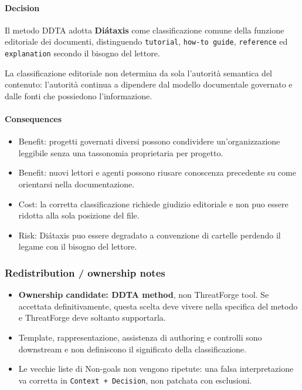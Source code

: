 \documentclass[
  10pt,
]{article}
\providecommand{\tightlist}{%
  \setlength{\itemsep}{0pt}\setlength{\parskip}{0pt}}
\begin{document}
\paragraph{Decision}\label{decision-1}

Il metodo DDTA adotta \textbf{Diátaxis} come classificazione comune
della funzione editoriale dei documenti, distinguendo \texttt{tutorial},
\texttt{how-to\ guide}, \texttt{reference} ed \texttt{explanation}
secondo il bisogno del lettore.

La classificazione editoriale non determina da sola l'autorità semantica
del contenuto: l'autorità continua a dipendere dal modello documentale
governato e dalle fonti che possiedono l'informazione.

\paragraph{Consequences}\label{consequences-1}

\begin{itemize}
\tightlist
\item
  Benefit: progetti governati diversi possono condividere
  un'organizzazione leggibile senza una tassonomia proprietaria per
  progetto.
\item
  Benefit: nuovi lettori e agenti possono riusare conoscenza precedente
  su come orientarsi nella documentazione.
\item
  Cost: la corretta classificazione richiede giudizio editoriale e non
  puo essere ridotta alla sola posizione del file.
\item
  Risk: Diátaxis puo essere degradato a convenzione di cartelle perdendo
  il legame con il bisogno del lettore.
\end{itemize}

\subsubsection{Redistribution / ownership
notes}\label{redistribution-ownership-notes}

\begin{itemize}
\tightlist
\item
  \textbf{Ownership candidate: DDTA method}, non ThreatForge tool. Se
  accettata definitivamente, questa scelta deve vivere nella specifica
  del metodo e ThreatForge deve soltanto supportarla.
\item
  Template, rappresentazione, assistenza di authoring e controlli sono
  downstream e non definiscono il significato della classificazione.
\item
  Le vecchie liste di Non-goals non vengono ripetute: una falsa
  interpretazione va corretta in \texttt{Context\ +\ Decision}, non
  patchata con esclusioni.
\end{itemize}
\end{document}
